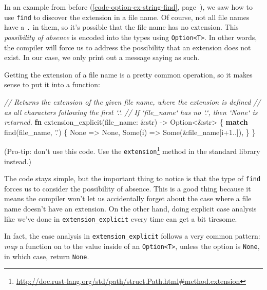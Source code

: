 \documentclass[a4paper,]{book}
\renewcommand*{\hyperlink}[2]{%
 #2 (\autoref{#1}, page~\pageref{#1})}
\newenvironment{Shaded}{\begin{snugshade}}{\end{snugshade}}
\newcommand{\KeywordTok}[1]{\textcolor[rgb]{0.13,0.29,0.53}{\textbf{{#1}}}}
\newcommand{\DataTypeTok}[1]{\textcolor[rgb]{0.13,0.29,0.53}{{#1}}}
\newcommand{\DecValTok}[1]{\textcolor[rgb]{0.00,0.00,0.81}{{#1}}}
\newcommand{\ConstantTok}[1]{\textcolor[rgb]{0.00,0.00,0.00}{{#1}}}
\newcommand{\CharTok}[1]{\textcolor[rgb]{0.31,0.60,0.02}{{#1}}}
\newcommand{\CommentTok}[1]{\textcolor[rgb]{0.56,0.35,0.01}{\textit{{#1}}}}
\newcommand{\NormalTok}[1]{{#1}}
\renewcommand{\href}[2]{#2\footnote{\url{#1}}}
\begin{document}
In an \protect\hyperlink{code-option-ex-string-find}{example from
before}, we saw how to use \texttt{find} to discover the extension in a
file name. Of course, not all file names have a \texttt{.} in them, so
it's possible that the file name has no extension. This
\emph{possibility of absence} is encoded into the types using
\texttt{Option\textless{}T\textgreater{}}. In other words, the compiler
will force us to address the possibility that an extension does not
exist. In our case, we only print out a message saying as such.

Getting the extension of a file name is a pretty common operation, so it
makes sense to put it into a function:

\begin{Shaded}
\begin{Highlighting}[]
\CommentTok{// Returns the extension of the given file name, where the extension is defined}
\CommentTok{// as all characters following the first `.`.}
\CommentTok{// If `file_name` has no `.`, then `None` is returned.}
\KeywordTok{fn} \NormalTok{extension_explicit(file_name: &}\DataTypeTok{str}\NormalTok{) -> }\DataTypeTok{Option}\NormalTok{<&}\DataTypeTok{str}\NormalTok{> \{}
    \KeywordTok{match} \NormalTok{find(file_name, }\CharTok{'.'}\NormalTok{) \{}
        \ConstantTok{None} \NormalTok{=> }\ConstantTok{None}\NormalTok{,}
        \ConstantTok{Some}\NormalTok{(i) => }\ConstantTok{Some}\NormalTok{(&file_name[i+}\DecValTok{1.}\NormalTok{.]),}
    \NormalTok{\}}
\NormalTok{\}}
\end{Highlighting}
\end{Shaded}

(Pro-tip: don't use this code. Use the
\href{http://doc.rust-lang.org/std/path/struct.Path.html\#method.extension}{\texttt{extension}}
method in the standard library instead.)

The code stays simple, but the important thing to notice is that the
type of \texttt{find} forces us to consider the possibility of absence.
This is a good thing because it means the compiler won't let us
accidentally forget about the case where a file name doesn't have an
extension. On the other hand, doing explicit case analysis like we've
done in \texttt{extension\_explicit} every time can get a bit tiresome.

In fact, the case analysis in \texttt{extension\_explicit} follows a
very common pattern: \emph{map} a function on to the value inside of an
\texttt{Option\textless{}T\textgreater{}}, unless the option is
\texttt{None}, in which case, return \texttt{None}.
\end{document}
